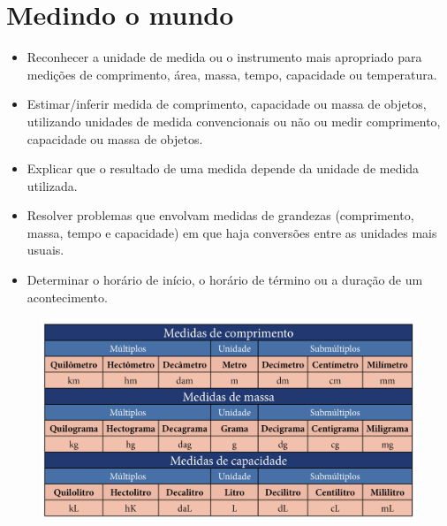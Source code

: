 \chapter{Medindo o mundo}



\begin{itemize}
\item Reconhecer a unidade de medida ou o instrumento mais apropriado para
medições de comprimento, área, massa, tempo, capacidade ou temperatura.

\item Estimar/inferir medida de comprimento, capacidade ou massa de objetos,
utilizando unidades de medida convencionais ou não ou medir comprimento,
capacidade ou massa de objetos.

\item Explicar que o resultado de uma medida depende da unidade de medida utilizada.

\item Resolver problemas que envolvam medidas de grandezas (comprimento,
massa, tempo e capacidade) em que haja conversões entre as unidades mais
usuais.

\item Determinar o horário de início, o horário de término ou a duração de
um acontecimento.
\end{itemize}


\begin{figure}[htpb!]
\includegraphics[width=\textwidth]{../ilustracoes/MAT5/SAEB_5ANO_MAT_figura30_1.png}
\end{figure}

